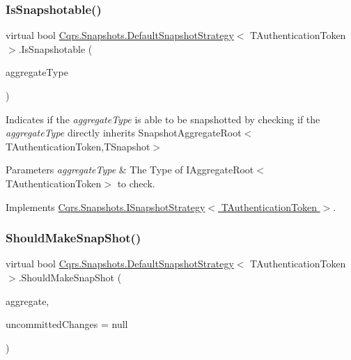 \subsubsection{\texorpdfstring{Is\+Snapshotable()}{IsSnapshotable()}}
{\footnotesize\ttfamily virtual bool \hyperlink{classCqrs_1_1Snapshots_1_1DefaultSnapshotStrategy}{Cqrs.\+Snapshots.\+Default\+Snapshot\+Strategy}$<$ T\+Authentication\+Token $>$.Is\+Snapshotable (\begin{DoxyParamCaption}\item[{Type}]{aggregate\+Type }\end{DoxyParamCaption})\hspace{0.3cm}{\ttfamily [virtual]}}



Indicates if the {\itshape aggregate\+Type}  is able to be snapshotted by checking if the {\itshape aggregate\+Type}  directly inherits Snapshot\+Aggregate\+Root$<$\+T\+Authentication\+Token,\+T\+Snapshot$>$ 


\begin{DoxyParams}{Parameters}
{\em aggregate\+Type} & The Type of I\+Aggregate\+Root$<$\+T\+Authentication\+Token$>$ to check.\\
\hline
\end{DoxyParams}


Implements \hyperlink{interfaceCqrs_1_1Snapshots_1_1ISnapshotStrategy_a02121821312c4ce2811b31eeaffabe51_a02121821312c4ce2811b31eeaffabe51}{Cqrs.\+Snapshots.\+I\+Snapshot\+Strategy$<$ T\+Authentication\+Token $>$}.

\mbox{\label{classCqrs_1_1Snapshots_1_1DefaultSnapshotStrategy_a9cdb3d79c55e2eb2796639b273d49ed9_a9cdb3d79c55e2eb2796639b273d49ed9}} 
\subsubsection{\texorpdfstring{Should\+Make\+Snap\+Shot()}{ShouldMakeSnapShot()}}
{\footnotesize\ttfamily virtual bool \hyperlink{classCqrs_1_1Snapshots_1_1DefaultSnapshotStrategy}{Cqrs.\+Snapshots.\+Default\+Snapshot\+Strategy}$<$ T\+Authentication\+Token $>$.Should\+Make\+Snap\+Shot (\begin{DoxyParamCaption}\item[{\hyperlink{interfaceCqrs_1_1Domain_1_1IAggregateRoot}{I\+Aggregate\+Root}$<$ T\+Authentication\+Token $>$}]{aggregate,  }\item[{I\+Enumerable$<$ \hyperlink{interfaceCqrs_1_1Events_1_1IEvent}{I\+Event}$<$ T\+Authentication\+Token $>$$>$}]{uncommitted\+Changes = {\ttfamily null} }\end{DoxyParamCaption})\hspace{0.3cm}{\ttfamily [virtual]}}



